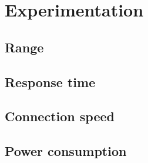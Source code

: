 \section{Experimentation} \label{sec:Experimentation}

\subsection{Range}

\subsection{Response time}

\subsection{Connection speed}

\subsection{Power consumption}
